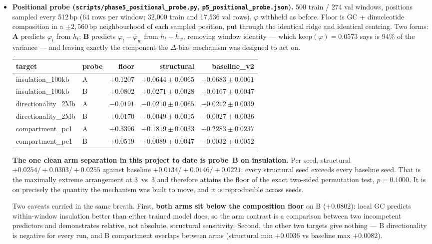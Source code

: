 \documentclass[11pt,a4paper]{article}
\newcommand{\code}[1]{\texttt{\small #1}}
\begin{document}
\begin{itemize}
\item \textbf{Positional probe (\code{scripts/phase5\_positional\_probe.py},
\code{p5\_positional\_probe.json}).} 500 train / 274 val windows, positions
sampled every 512\,bp (64 rows per window; 32{,}000 train and 17{,}536 val
rows), $\varphi$ withheld as before. Floor is GC + dinucleotide composition in a
$\pm2{,}560$\,bp neighbourhood of each sampled position, put through the
identical ridge and identical centring. Two forms: \textbf{A} predicts
$\varphi_t$ from $h_t$; \textbf{B} predicts $\varphi_t - \overline{\varphi}_w$
from $h_t - \overline{h}_w$, removing window identity --- which
$\mathrm{keep}(\varphi)=0.0573$ says is $94\%$ of the variance --- and leaving
exactly the component the $\Delta$-bias mechanism was designed to act on.

\begin{center}
\begin{tabular}{llrrr}
\toprule
target & probe & floor & structural & baseline\_v2 \\
\midrule
insulation\_100kb   & A & $+0.1207$ & $+0.0644 \pm 0.0065$ & $+0.0683 \pm 0.0061$ \\
insulation\_100kb   & B & $+0.0802$ & $+0.0271 \pm 0.0028$ & $+0.0167 \pm 0.0047$ \\
directionality\_2Mb & A & $-0.0191$ & $-0.0210 \pm 0.0065$ & $-0.0212 \pm 0.0039$ \\
directionality\_2Mb & B & $+0.0170$ & $-0.0049 \pm 0.0015$ & $-0.0027 \pm 0.0036$ \\
compartment\_pc1    & A & $+0.3396$ & $+0.1819 \pm 0.0033$ & $+0.2283 \pm 0.0237$ \\
compartment\_pc1    & B & $+0.0519$ & $+0.0089 \pm 0.0047$ & $+0.0032 \pm 0.0052$ \\
\bottomrule
\end{tabular}
\end{center}

\textbf{The one clean arm separation in this project to date is probe~B on
insulation.} Per seed, structural $+0.0254 / +0.0303 / +0.0255$ against baseline
$+0.0134 / +0.0146 / +0.0221$: every structural seed exceeds every baseline
seed. That is the maximally extreme arrangement at 3~vs~3 and therefore attains
the floor of the exact two-sided permutation test, $p = 0.1000$. It is on
precisely the quantity the mechanism was built to move, and it is reproducible
across seeds.

Two caveats carried in the same breath. First, \textbf{both arms sit below the
composition floor} on B ($+0.0802$): local GC predicts within-window insulation
better than either trained model does, so the arm contrast is a comparison
between two incompetent predictors and demonstrates relative, not absolute,
structural sensitivity. Second, the other two targets give nothing --- B
directionality is negative for every run, and B compartment overlaps between
arms (structural min $+0.0036$ vs baseline max $+0.0082$).


\end{itemize}
\end{document}
